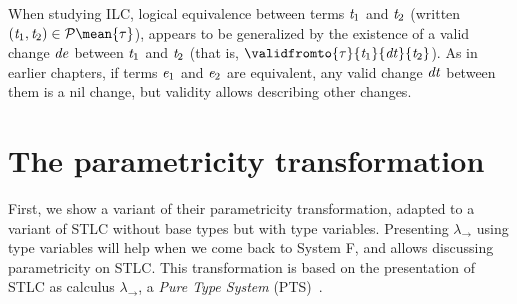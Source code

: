 When studying ILC, logical equivalence between terms \ensuremath{\Varid{t}_{1}} and \ensuremath{\Varid{t}_{2}}
(written \ensuremath{(\Varid{t}_{1},\Varid{t}_{2})\in \mathcal{P}\mean{\tau}}), appears to be generalized by the existence
of a valid change \ensuremath{\Varid{de}} between \ensuremath{\Varid{t}_{1}} and \ensuremath{\Varid{t}_{2}} (that is, \ensuremath{\validfromto{\tau}{\Varid{t}_{1}}{\Varid{dt}}{\Varid{t}_{2}}}).
As in earlier chapters, if terms \ensuremath{\Varid{e}_{1}} and \ensuremath{\Varid{e}_{2}} are equivalent, any valid change
\ensuremath{\Varid{dt}} between them is a nil change, but validity allows describing other changes.


\section{The parametricity transformation}
\label{sec:parametricity-transform}
First, we show a variant of their parametricity transformation, adapted to a
variant of STLC without base types but with type variables. Presenting \ensuremath{\lambda_{\to}}
using type variables will help when we come back to System F, and allows
discussing parametricity on STLC\@.
This transformation
is based on the presentation of STLC as calculus \ensuremath{\lambda_{\to}}, a \emph{Pure Type
System} (PTS)~\citep[Sec.~5.2]{Barendregt1992lambda}.

